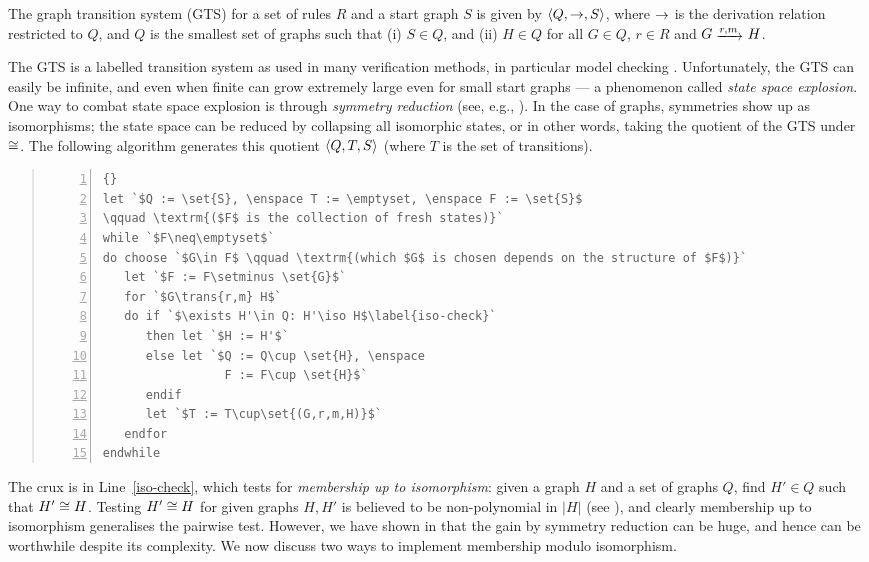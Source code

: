 \begin{definition}
  The graph transition system (GTS) for a set of rules $R$ and a start graph $S$ is
  given by ${\langle Q,{\rightarrow},S \rangle}$, where $\rightarrow$ is the derivation relation
  restricted to $Q$, and $Q$ is the smallest set of graphs such that (i) $S\in
  Q$, and (ii) $H\in Q$ for all $G\in Q$, $r\in R$ and $G\trans{r,m} H$.
\end{definition}
%
The GTS is a labelled transition system as used in many verification methods,
in particular model checking \cite{BaierKat2009}.  Unfortunately, the GTS can
easily be infinite, and even when finite can grow extremely large even for
small start graphs --- a phenomenon called \emph{state
  space explosion}. One way to combat state space explosion is through
\emph{symmetry reduction} (see, e.g., \cite{Clarke+1996}). In the case of
graphs, symmetries show up as isomorphisms; the state space can be reduced by
collapsing all isomorphic states, or in other words, taking the quotient of the
GTS under $\cong$. The following algorithm generates this quotient ${\langle Q,T,S \rangle}$
(where $T$ is the set of transitions).
%
\begin{quote}
\begin{lstlisting}[keywords={while,endwhile,if,then,else,endif,let,do,choose,for,endfor},numbers=left]{}
let `$Q := \set{S}, \enspace T := \emptyset, \enspace F := \set{S}$
\qquad \textrm{($F$ is the collection of fresh states)}`
while `$F\neq\emptyset$`
do choose `$G\in F$ \qquad \textrm{(which $G$ is chosen depends on the structure of $F$)}`
   let `$F := F\setminus \set{G}$`
   for `$G\trans{r,m} H$`
   do if `$\exists H'\in Q: H'\iso H$\label{iso-check}`
      then let `$H := H'$`
      else let `$Q := Q\cup \set{H}, \enspace
                 F := F\cup \set{H}$`
      endif
      let `$T := T\cup\set{(G,r,m,H)}$`
   endfor
endwhile
\end{lstlisting}
\end{quote}
%
The crux is in Line~\ref{iso-check}, which tests for
\emph{membership up to isomorphism}: given a graph $H$ and a set of graphs
$Q$, find $H'\in Q$ such that $H'\cong H$. Testing $H'\cong H$ for given graphs
$H,H'$ is believed to be non-polynomial in $|H|$ (see \cite{Weisstein2002}),
and clearly membership up to isomorphism generalises the pairwise test.
However, we have shown in \cite{Rensink2006,CrouzenPolRen2008} that the gain by
symmetry reduction can be huge, and hence can be worthwhile despite its
complexity. We now discuss two ways to implement membership modulo isomorphism.

